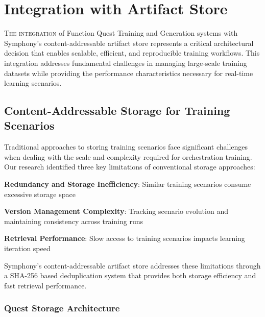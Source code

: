
\section*{Integration with Artifact Store}

\lettrine{T}{he integration} of Function Quest Training and Generation systems with Symphony's content-addressable artifact store represents a critical architectural decision that enables scalable, efficient, and reproducible training workflows. This integration addresses fundamental challenges in managing large-scale training datasets while providing the performance characteristics necessary for real-time learning scenarios.

\subsection*{Content-Addressable Storage for Training Scenarios}

Traditional approaches to storing training scenarios face significant challenges when dealing with the scale and complexity required for orchestration training. Our research identified three key limitations of conventional storage approaches:

\begin{expandedlist}
    \item \textbf{Redundancy and Storage Inefficiency}: Similar training scenarios consume excessive storage space
    \item \textbf{Version Management Complexity}: Tracking scenario evolution and maintaining consistency across training runs
    \item \textbf{Retrieval Performance}: Slow access to training scenarios impacts learning iteration speed
\end{expandedlist}

Symphony's content-addressable artifact store addresses these limitations through a SHA-256 based deduplication system that provides both storage efficiency and fast retrieval performance.

\subsubsection*{Quest Storage Architecture}

